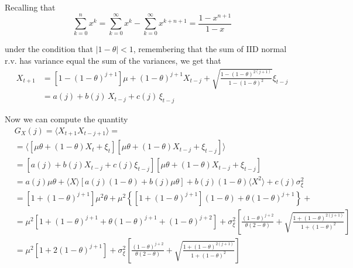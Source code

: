 \documentclass[a4paper, 10pt]{article}
\newcommand{\avg}[1]{\langle#1\rangle}
\newcommand{\sigmaxi}{\sigma_{\xi}}
\begin{document}
  Recalling that
  \begin{equation}
    \sum_{k=0}^{n} x^k = \sum_{k=0}^{\infty} x^k  - \sum_{k=0}^{\infty}
    x^{k+n+1} = \frac{1 - x^{n+1}}{1 - x}
  \end{equation}

  under the condition that $|1-\theta| < 1$, remembering that the sum of IID
  normal r.v. has variance equal the sum of the variances, we get that
  \begin{align}
    X_{t+1} 
      &= \left[1 - (1-\theta)^{j+1}\right] \mu  + (1-\theta)^{j+1}
      X_{t-j} + \sqrt{\frac{1-(1-\theta)^{2(j+1)}}{1-(1-\theta)^2}} \xi_{t-j} \\
      &= a(j) + b(j) \, X_{t-j} + c(j) \, \xi_{t-j}
  \end{align}

  Now we can compute the quantity
  \begin{align}
    &G_X(j) = \avg{X_{t+1} X_{t-j+1}} = \\
    &= \avg{[\mu \theta + (1-\theta) X_t + \xi_t][\mu \theta + (1-\theta) X_{t-j} +
    \xi_{t-j}]} \\
    &= [a(j) + b(j)X_{t-j} + c(j)\xi_{t-j}][\mu \theta + (1-\theta) X_{t-j} +
    \xi_{t-j}]\\
    &= a(j) \mu \theta + \avg{X} \left[a(j)(1-\theta) + b(j) \mu \theta\right] +
    b(j)(1-\theta) \avg{X^2} + c(j) \sigmaxi^2\\[10pt]
    &= [1+(1-\theta)^{j+1}] \mu^2 \theta + \mu^2 
    \left\{[1+(1-\theta)^{j+1}](1-\theta) + \theta (1-\theta)^{j+1}
    \right\}  +\\
    &= \mu^2 \left[1+(1-\theta)^{j+1} + \theta (1-\theta)^{j+1} +
    (1-\theta)^{j+2} \right] +
    \sigmaxi^2\left[\frac{(1-\theta)^{j+2}}{\theta(2-\theta)} + \sqrt{\frac{1 +
    (1-\theta)^{2(j+1)}}{1+(1-\theta)^2}}\right]\\
    &= \mu^2 \left[ 1 + 2(1-\theta)^{j+1}\right] +
    \sigmaxi^2\left[\frac{(1-\theta)^{j+2}}{\theta(2-\theta)} + \sqrt{\frac{1 +
    (1-\theta)^{2(j+1)}}{1+(1-\theta)^2}}\right]
  \end{align}


\end{document}
